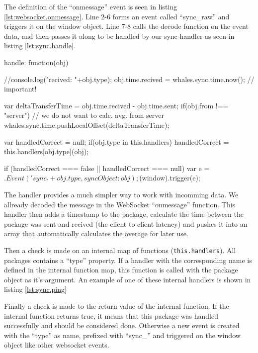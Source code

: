 The definition of the ``onmessage'' event is seen in listing \ref{lst:websocket.onmessage}.
Line 2-6 forms an event called ``sync\_raw'' and triggers it on the window
object.
Line 7-8 calls the decode function on the event data, and then passes it along
to be handled by our sync handler as seen in listing \ref{lst:sync.handle}.

\begin{snippet}[caption=Handling of incomming data,label=lst:sync.handle]
    handle: function(obj) {
        //console.log("recived: "+obj.type);
        obj.time.recived = whales.sync.time.now(); // important!

        var deltaTransferTime = obj.time.recived - obj.time.sent;
        if(obj.from !== "server") { // we do not want to calc. avg. from server
            whales.sync.time.pushLocalOffset(deltaTransferTime);
        }
        
        var handledCorrect = null;
        if(obj.type in this.handlers) {
            handledCorrect = this.handlers[obj.type](obj);
        }
        
        if (handledCorrect === false || handledCorrect === null){
            var e = $.Event('sync_'+obj.type,{
                syncObject:obj
            });
            $(window).trigger(e);
        }
    }
\end{snippet}

The handler provides a much simpler way to work with incomming data. We allready
decoded the message in the WebSocket ``onmessage'' function. This handler then
adds a timestamp to the package, calculate the time between the package was sent
and recived (the client to client latency) and pushes it into an array that
automatically calculates the average for later use.


Then a check is made on an internal map of functions
(\lstinline$this.handlers$).
All packages contains a ``type'' property. If a handler with the
corresponding name is defined in the internal function map, this function is
called with the package object as it's argument. An example of one of these
internal handlers is shown in listing \ref{lst:sync.ping}


Finally a check is made to the return value of the internal function. If the
internal function returns true, it means that this package was handled
successfully and should be considered done.
Otherwise a new event is created with the ``type'' as name, prefixed with
``sync\_'' and triggered on the window object like other websocket events.

